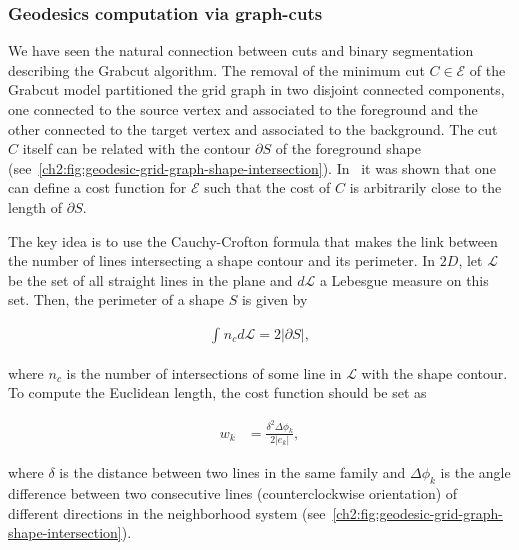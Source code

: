 \subsubsection{Geodesics computation via graph-cuts}

We have seen the natural connection between cuts and binary segmentation describing the Grabcut algorithm. The removal of the minimum cut $C \in \mathcal{E}$ of the Grabcut model partitioned the grid graph in two disjoint connected components, one connected to the source vertex and associated to the foreground and the other connected to the target vertex and associated to the background. The cut $C$ itself can be related with the contour $\partial S$ of the foreground shape (see~\cref{ch2:fig:geodesic-grid-graph-shape-intersection}). In~\cite{boykov03geodesics} it was shown that one can define a cost function for $\mathcal{E}$ such that the cost of $C$ is arbitrarily close to the length of $\partial S$.

The key idea is to use the Cauchy-Crofton formula that makes the link between the number of lines intersecting a shape contour and its perimeter. In $2D$, let $\mathcal{L}$ be the set of all straight lines in the plane and $d\mathcal{L}$ a Lebesgue measure on this set. Then, the perimeter of a shape $S$ is given by

\begin{align*}
\int_{}{n_c}d{\mathcal{L}} = 2|\partial S|,
\end{align*}

where $n_c$ is the number of intersections of some line in $\mathcal{L}$ with the shape contour. To compute the Euclidean length, the cost function should be set as

\begin{align*}
	w_k &= \frac{ \delta^2 \Delta \phi_k }{2 |e_k|},
\end{align*}

where $\delta$ is the distance between two lines in the same family and $\Delta \phi_k$ is the angle difference between two consecutive lines (counterclockwise orientation) of different directions in the neighborhood system (see~\cref{ch2:fig:geodesic-grid-graph-shape-intersection}).

